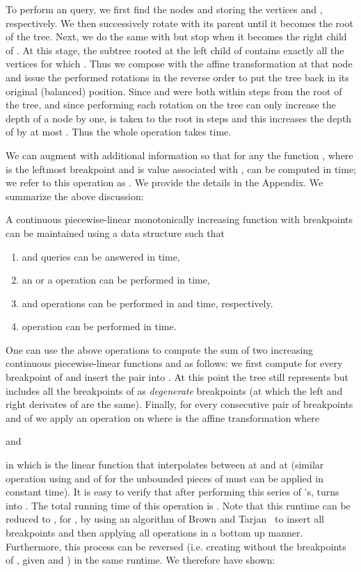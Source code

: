 \documentclass[11pt]{article}
\begin{document}
To perform an  query, we first find the nodes  and  storing the vertices  and , respectively. 
We then successively rotate  with its parent until it becomes the root of the tree.  Next, we do the same with  but stop when it becomes the right child of .  At this stage, the subtree rooted at the left child of  contains exactly all the vertices  for which .  Thus we compose  with the affine transformation at that node and issue the performed rotations in the reverse order to put the tree back in its original (balanced) position. Since  and  were both within  steps from the root of the tree, and since performing each rotation on the tree can only increase the depth of a node by one,  is taken to the root in  steps and this increases the depth of  by at most . Thus the whole operation takes  time.

We can augment  with additional information so that for any  the function , where  is the leftmost breakpoint 
and  is value associated with , 
can be computed in  time; we refer to this operation as .  We provide the details in the Appendix.  
We summarize the above discussion:

\begin{theorem}\label{thm:ACT}
A continuous piecewise-linear monotonically increasing function 
 with  breakpoints can be maintained using a data structure 
 such that
\begin{enumerate}
\item  and  queries can be answered in  time,
\item an  or a  operation can be performed in  time, 
\item  and  operations can be performed in  and  time, respectively.
\item  operation can be performed in  time.  
\end{enumerate}
\end{theorem}

One can use the above operations to compute the sum of two increasing continuous piecewise-linear functions  and  as follows: we first compute  for every breakpoint  of  and insert the pair  into .  At this point  the tree still represents  but includes all the breakpoints of  as {\em degenerate} breakpoints (at which the left and right derivates of  are the same). Finally, for every consecutive pair of breakpoints  and  of  we  apply an  operation on  where  is the affine transformation  where
 
and 
 
in which  is the linear function that interpolates between  at  and  at  (similar operation using  and  of  for the unbounded pieces of  must can be applied in constant time). It is easy to verify that after performing this series of 's,  turns into . The total running time of this operation is . Note that this runtime can be reduced to ,  for , by using an algorithm of Brown and Tarjan~\cite{BT79} to insert all breakpoints and then applying all  operations in a bottom up manner.  Furthermore, this process can be reversed (i.e. creating  without the breakpoints of , given  and ) in the same runtime.  We therefore have shown:
\end{document}
